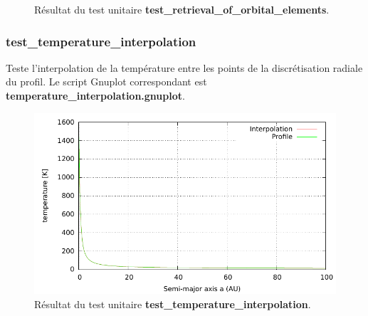 \begin{figure}[htbp]
\centering
{}\hfill
{}

\caption{Résultat du test unitaire \textbf{test\_retrieval\_of\_orbital\_elements}.}
\end{figure}

\subsubsection{test\_temperature\_interpolation}
Teste l'interpolation de la température entre les points de la discrétisation radiale du profil. Le script Gnuplot correspondant est \textbf{temperature\_interpolation.gnuplot}.

\begin{figure}[htbp]
\centering
\includegraphics[width=0.65\linewidth]{figure/unitary_tests/temperature_interpolation.pdf}
\caption{Résultat du test unitaire \textbf{test\_temperature\_interpolation}.}
\end{figure}

